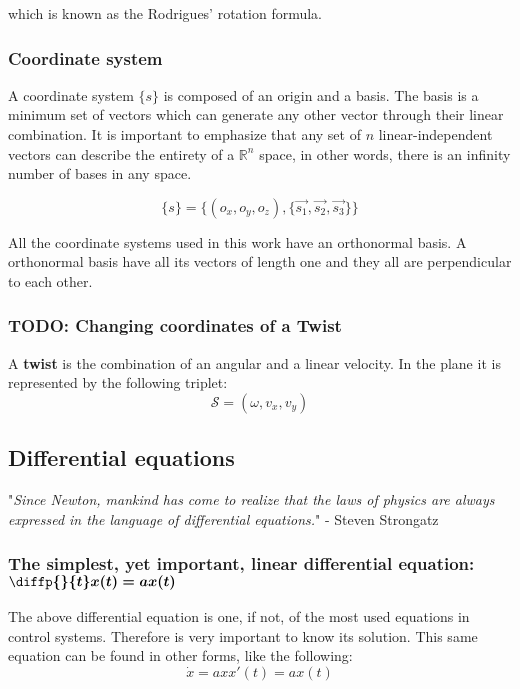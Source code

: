 \documentclass[12pt]{article}
\begin{document}
which is known as the Rodrigues' rotation formula.

\subsubsection{Coordinate system}
A coordinate system $\{s\}$ is composed of an origin and a basis. The basis is a minimum set of vectors which can generate any other vector through their linear combination. It is important to emphasize that any set of $n$ linear-independent vectors can describe the entirety of a $\mathbb{R}^n$ space, in other words, there is an infinity number of bases in any space.

\begin{equation}
    \{s\} = \{(o_x, o_y, o_z), \{\vec{s_1}, \vec{s_2}, \vec{s_3}\}\}
    \label{eq:coord-system}
\end{equation}

All the coordinate systems used in this work have an orthonormal basis. A orthonormal basis have all its vectors of length one and they all are perpendicular to each other. 

\color{blue}
\subsubsection{TODO: Changing coordinates of a Twist}
A \textbf{twist} is the combination of an angular and a linear velocity. In the plane it is represented by the following triplet:
\begin{equation}
    \mathcal{S} = (\omega, v_x, v_y)
    \label{eq:twist2d}
\end{equation}
\color{black}

\subsection{Differential equations}
"\textit{Since Newton, mankind has come to realize that the laws of physics are always expressed in the language of differential equations.}" - Steven Strongatz

\subsubsection{The simplest, yet important, linear differential equation: $\boldsymbol{\protect\diffp{}{t} x(t) = a x(t)}$ }
The above differential equation is one, if not, of the most used equations in control systems. Therefore is very important to know its solution. This same equation can be found in other forms, like the following:
\begin{subequations}
    \begin{equation}
        \dot{x} = ax
    \end{equation} 
    \begin{equation}
        x'(t) = a x(t)
    \end{equation}
    \label{eq:simplest-edo}
\end{subequations}
\end{document}
